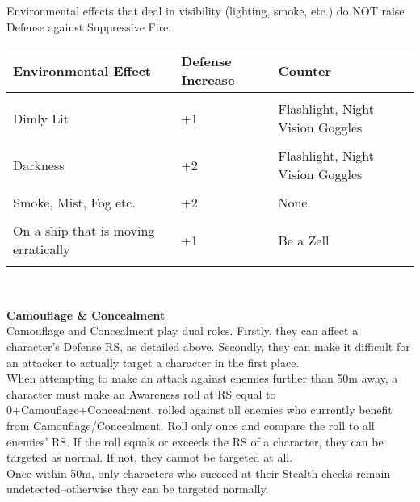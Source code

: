 \documentclass[a4paper, twocolumn, openany]{book}
\begin{document}
{Environmental effects that deal in visibility (lighting, smoke, etc.) do NOT raise Defense against
Suppressive Fire.\\

{\centering
\begin{tabular}{p{2.3cm}p{1.5cm}p{2cm}}
Environmental Effect 					& Defense Increase & Counter\\ \hline \\
Dimly Lit 								& +1 				& Flashlight, Night Vision Goggles\\ \\
Darkness 								& +2 				& Flashlight, Night Vision Goggles\\ \\
Smoke, Mist, Fog etc. 					& +2 				& None\\ \\
On a ship that is moving erratically 	& +1 				& Be a Zell\\ \\ \hline
\end{tabular}\\[\baselineskip] }\vspace*{\fill}

{\bfseries Camouflage \& Concealment\\}
Camouflage and Concealment play dual roles. Firstly, they can affect a character’s Defense RS,
as detailed above. Secondly, they can make it difficult for an attacker to actually target a
character in the first place.\\

When attempting to make an attack against enemies further than 50m away, a character must
make an Awareness roll at RS equal to 0+Camouflage+Concealment, rolled against all enemies
who currently benefit from Camouflage/Concealment. Roll only once and compare the roll to all
enemies’ RS. If the roll equals or exceeds the RS of a character, they can be targeted as
normal. If not, they cannot be targeted at all.\\
Once within 50m, only characters who succeed at their Stealth checks remain
undetected--otherwise they can be targeted normally.\\

}
\end{document}
